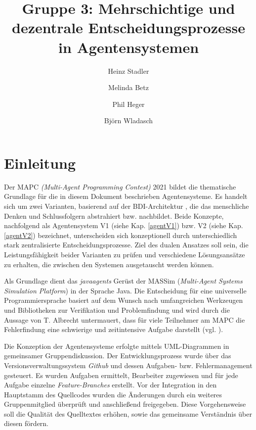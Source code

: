 \documentclass[runningheads]{llncs}
\begin{document}
	\title{Gruppe 3: Mehrschichtige und dezentrale Entscheidungsprozesse in Agentensystemen}
	\author{Heinz Stadler\and
		Melinda Betz\and
		Phil Heger\and
		Björn Wladasch}
	\maketitle              %
	\section{Einleitung}
	Der MAPC \textit{(Multi-Agent Programming Contest)} 2021 \cite{MAPC2021} bildet die thematische Grundlage für die in diesem Dokument beschrieben Agentensysteme. Es handelt sich um zwei Varianten, basierend auf der BDI-Architektur \cite{Bratman1987}, die das menschliche Denken und Schlussfolgern abstrahiert bzw. nachbildet. Beide Konzepte, nachfolgend als Agentensystem V1 (siehe Kap. \ref{agentV1}) bzw. V2 (siehe Kap. \ref{agentV2}) bezeichnet, unterscheiden sich konzeptionell durch unterschiedlich stark zentralisierte Entscheidungsprozesse.
	Ziel des dualen Ansatzes soll sein, die Leistungsfähigkeit beider Varianten zu prüfen und verschiedene Lösungsansätze zu erhalten, die zwischen den Systemen ausgetauscht werden können.

	
	Als Grundlage dient das \textit{javaagents} Gerüst der MASSim (\textit{Multi-Agent Systems Simulation Platform}) \cite{EISMASSim} in der Sprache Java. Die Entscheidung für eine universelle Programmiersprache basiert auf dem Wunsch nach umfangreichen Werkzeugen und Bibliotheken zur Verifikation und Problemfindung und wird durch die Aussage von T. Albrecht untermauert, dass für viele Teilnehmer am MAPC die Fehlerfindung eine schwierige und zeitintensive Aufgabe darstellt (vgl. \cite[S. 17]{Ahlbrecht2021}).
	
	Die Konzeption der Agentensysteme erfolgte mittels UML-Diagrammen in gemeinsamer Gruppendiskussion.
	Der Entwicklungsprozess wurde über das Versionsverwaltungssystem \textit{Github} und dessen Aufgaben- bzw. Fehlermanagement gesteuert. Es wurden Aufgaben ermittelt, Bearbeiter zugewiesen und für jede Aufgabe einzelne \textit{Feature-Branches} erstellt. Vor der Integration in den Hauptstamm des Quellcodes wurden die Änderungen durch ein weiteres Gruppenmitglied überprüft und anschließend freigegeben. Diese Vorgehensweise soll die Qualität des Quelltextes erhöhen, sowie das gemeinsame Verständnis über diesen fördern.
	
\end{document}
